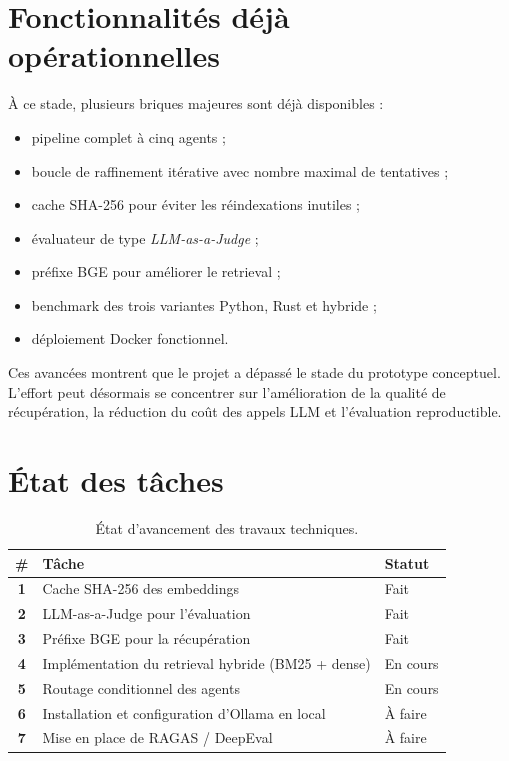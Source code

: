 \documentclass[12pt,a4paper]{report}
\begin{document}
\section{Fonctionnalités déjà opérationnelles}

À ce stade, plusieurs briques majeures sont déjà disponibles :

\begin{itemize}[leftmargin=1.2cm]
  \item pipeline complet à cinq agents ;
  \item boucle de raffinement itérative avec nombre maximal de tentatives ;
  \item cache SHA-256 pour éviter les réindexations inutiles ;
  \item évaluateur de type \textit{LLM-as-a-Judge} ;
  \item préfixe BGE pour améliorer le retrieval ;
  \item benchmark des trois variantes Python, Rust et hybride ;
  \item déploiement Docker fonctionnel.
\end{itemize}

Ces avancées montrent que le projet a dépassé le stade du prototype conceptuel. L'effort peut désormais se concentrer sur l'amélioration de la qualité de récupération, la réduction du coût des appels LLM et l'évaluation reproductible.

\section{État des tâches}

\begin{table}[H]
  \centering
  \renewcommand{\arraystretch}{1.25}
  \begin{tabular}{>{\bfseries}c p{9cm} l}
    \toprule
    \# & Tâche & Statut \\
    \midrule
    1 & Cache SHA-256 des embeddings & Fait \\
    2 & LLM-as-a-Judge pour l'évaluation & Fait \\
    3 & Préfixe BGE pour la récupération & Fait \\
    4 & Implémentation du retrieval hybride (BM25 + dense) & En cours \\
    5 & Routage conditionnel des agents & En cours \\
    6 & Installation et configuration d'Ollama en local & À faire \\
    7 & Mise en place de RAGAS / DeepEval & À faire \\
    \bottomrule
  \end{tabular}
  \caption{État d'avancement des travaux techniques.}
\end{table}
\end{document}
